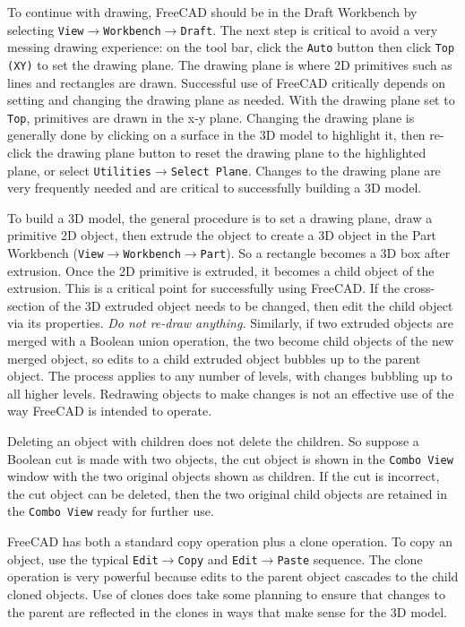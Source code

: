 \documentclass[titlepage]{article}
\renewcommand\_{\textunderscore\linebreak[1]}
\begin{document}
To continue with drawing, FreeCAD should be in the Draft Workbench by selecting \newline \texttt{View}$\rightarrow$\texttt{Workbench}$\rightarrow$\texttt{Draft}.  The next step is critical to avoid a very messing drawing experience:  on the tool bar, click the \texttt{Auto} button then click \texttt{Top (XY)} to set the drawing plane.  The drawing plane is where 2D primitives such as lines and rectangles are drawn.  Successful use of FreeCAD critically depends on setting and changing the drawing plane as needed.  With the drawing plane set to \texttt{Top}, primitives are drawn in the x-y plane.  Changing the drawing plane is generally done by clicking on a surface in the 3D model to highlight it, then re-click the drawing plane button to reset the drawing plane to the highlighted plane, or select \texttt{Utilities}$\rightarrow$\texttt{Select Plane}.  Changes to the drawing plane are very frequently needed and are critical to successfully building a 3D model. 

To build a 3D model, the general procedure is to set a drawing plane, draw a primitive 2D object, then extrude the object to create a 3D object in the Part Workbench (\texttt{View}$\rightarrow$\texttt{Workbench}$\rightarrow$\texttt{Part}).  So a rectangle becomes a 3D box after extrusion.  Once the 2D primitive is extruded, it becomes a child object of the extrusion.  This is a critical point for successfully using FreeCAD.  If the cross-section of the 3D extruded object needs to be changed, then edit the child object via its properties.  \textit{Do not re-draw anything.}  Similarly, if two extruded objects are merged with a Boolean union operation, the two become child objects of the new merged object, so edits to a child extruded object bubbles up to the parent object.  The process applies to any number of levels, with changes bubbling up to all higher levels.  Redrawing objects to make changes is not an effective use of the way FreeCAD is intended to operate.

Deleting an object with children does not delete the children.  So suppose a Boolean cut is made with two objects, the cut object is shown in the \texttt{Combo View} window with the two original objects shown as children.  If the cut is incorrect, the cut object can be deleted, then the two original child objects are retained in the \texttt{Combo View} ready for further use.

FreeCAD has both a standard copy operation plus a clone operation.  To copy an object, use the typical \texttt{Edit}$\rightarrow$\texttt{Copy} and \texttt{Edit}$\rightarrow$\texttt{Paste} sequence.  The clone operation is very powerful because edits to the parent object cascades to the child cloned objects.  Use of clones does take some planning to ensure that changes to the parent are reflected in the clones in ways that make sense for the 3D model.
\end{document}
